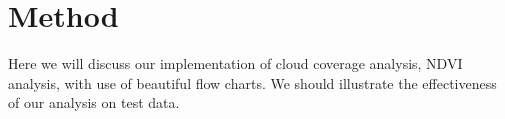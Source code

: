 \section{Method}

Here we will discuss our implementation of cloud coverage analysis,
NDVI analysis, with use of beautiful flow charts. We should illustrate
the effectiveness of our analysis on test data.


